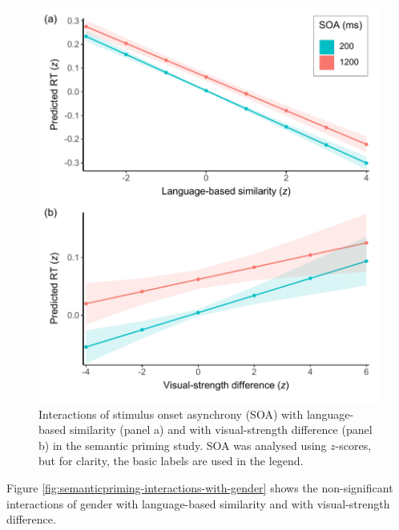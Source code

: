 \documentclass[
  12pt,
  man,floatsintext]{apa7}
\begin{document}
\begin{figure}

{\centering \includegraphics[width=0.8\linewidth]{../semanticpriming/frequentist_analysis/plots/semanticpriming-interactions-with-SOA} 

}

\caption{Interactions of stimulus onset asynchrony (SOA) with language-based similarity (panel a) and with visual-strength difference (panel b) in the semantic priming study. SOA was analysed using $z$-scores, but for clarity, the basic labels are used in the legend.}\label{fig:semanticpriming-interactions-with-SOA}
\end{figure}

Figure \ref{fig:semanticpriming-interactions-with-gender} shows the non-significant interactions of gender with language-based similarity and with visual-strength difference.
\end{document}
